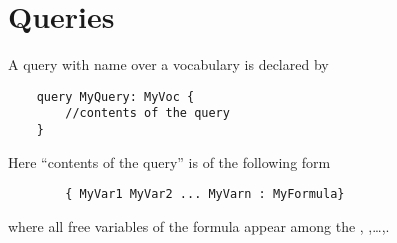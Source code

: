 \section{Queries}
A query with name  over a vocabulary  is declared by
\begin{lstlisting}
	query MyQuery: MyVoc {
		//contents of the query
	}
\end{lstlisting}
Here ``contents of the query'' is of the following form 
\begin{lstlisting}
		{ MyVar1 MyVar2 ... MyVarn : MyFormula}
\end{lstlisting}
where all free  variables of the \fodot formula  appear among the , ,\ldots,.
